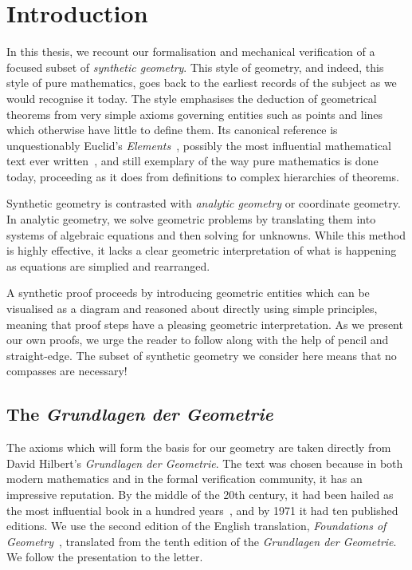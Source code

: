 \chapter{Introduction}\label{chapter:Introduction}
In this thesis, we recount our formalisation and mechanical verification of a focused subset of \emph{synthetic geometry}. This style of geometry, and indeed, this style of pure mathematics, goes back to the earliest records of the subject as we would recognise it today. The style emphasises the deduction of geometrical theorems from very simple axioms governing entities such as points and lines which otherwise have little to define them. Its canonical reference is unquestionably Euclid's \emph{Elements}~\cite{HeathElements}, possibly the most influential mathematical text ever written~\cite{BoyerEuclidInfluence}, and still exemplary of the way pure mathematics is done today, proceeding as it does from definitions to complex hierarchies of theorems.

Synthetic geometry is contrasted with \emph{analytic geometry} or coordinate geometry. In analytic geometry, we solve geometric problems by translating them into systems of algebraic equations and then solving for unknowns. While this method is highly effective, it lacks a clear geometric interpretation of what is happening as equations are simplied and rearranged.

A synthetic proof proceeds by introducing geometric entities which can be visualised as a diagram and reasoned about directly using simple principles, meaning that proof steps have a pleasing geometric interpretation. As we present our own proofs, we urge the reader to follow along with the help of pencil and straight-edge. The subset of synthetic geometry we consider here means that no compasses are necessary!

\section{The \emph{Grundlagen der Geometrie}}
The axioms which will form the basis for our geometry are taken directly from David Hilbert's \emph{Grundlagen der Geometrie}. The text was chosen because in both modern mathematics and in the formal verification community, it has an impressive reputation. By the middle of the 20th century, it had been hailed as the most influential book in a hundred years~\cite{BirkhoffHilbertInfluence}, and by 1971 it had ten published editions. We use the second edition of the English translation, \emph{Foundations of Geometry}~\cite{FoundationsOfGeometry}, translated from the tenth edition of the \emph{Grundlagen der Geometrie}. We follow the presentation to the letter. 

